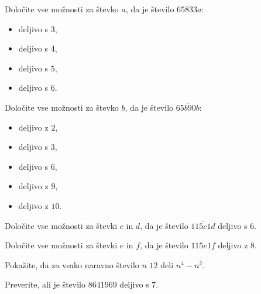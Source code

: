     
        \begin{naloga}
            Določite vse možnosti za števko $a$, da je število $\overline{65833a}$:
            \begin{itemize}
                \item deljivo s $3$, 
                \item deljivo s $4$, 
                \item deljivo s $5$, 
                \item deljivo s $6$. 
            \end{itemize}
        \end{naloga}
    

    
        \begin{naloga}
            Določite vse možnosti za števko $b$, da je število $\overline{65b90b}$:
            \begin{itemize}
                \item deljivo z $2$, 
                \item deljivo s $3$, 
                \item deljivo s $6$, 
                \item deljivo z $9$, 
                \item deljivo z $10$. 
            \end{itemize}
        \end{naloga}
    

    
        \begin{naloga}
            Določite vse možnosti za števki $c$ in $d$, da je število $\overline{115c1d}$ deljivo s $6$.
            
        \end{naloga}

        \begin{naloga}
            Določite vse možnosti za števki $e$ in $f$, da je število $\overline{115e1f}$ deljivo z $8$.
            
        \end{naloga}

    


    
        \begin{naloga}
            Pokažite, da za vsako naravno število $n$ $12$ deli $n^4-n^2$.
            
        \end{naloga}

        \begin{naloga}
            Preverite, ali je število $8641 969$ deljivo s $7$.
            
        \end{naloga}
        
            
    